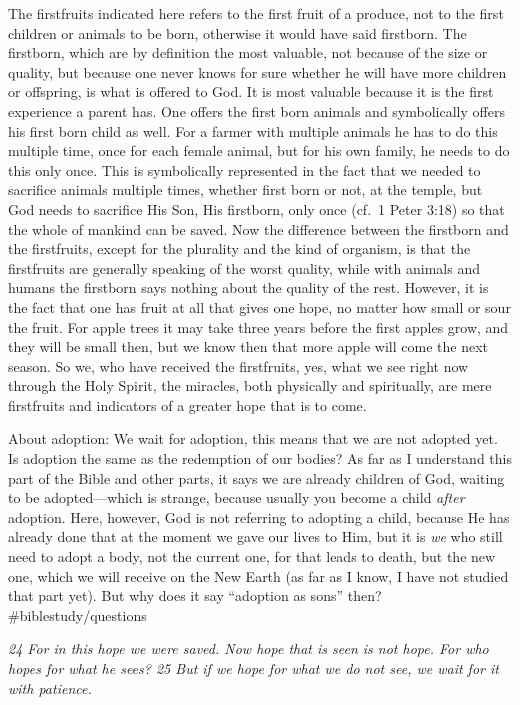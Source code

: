 The firstfruits indicated here refers to the first fruit of a produce,
not to the first children or animals to be born, otherwise it would have
said firstborn. The firstborn, which are by definition the most
valuable, not because of the size or quality, but because one never
knows for sure whether he will have more children or offspring, is what
is offered to God. It is most valuable because it is the first
experience a parent has. One offers the first born animals and
symbolically offers his first born child as well. For a farmer with
multiple animals he has to do this multiple time, once for each female
animal, but for his own family, he needs to do this only once. This is
symbolically represented in the fact that we needed to sacrifice animals
multiple times, whether first born or not, at the temple, but God needs
to sacrifice His Son, His firstborn, only once (cf.~1 Peter 3:18) so
that the whole of mankind can be saved. Now the difference between the
firstborn and the firstfruits, except for the plurality and the kind of
organism, is that the firstfruits are generally speaking of the worst
quality, while with animals and humans the firstborn says nothing about
the quality of the rest. However, it is the fact that one has fruit at
all that gives one hope, no matter how small or sour the fruit. For
apple trees it may take three years before the first apples grow, and
they will be small then, but we know then that more apple will come the
next season. So we, who have received the firstfruits, yes, what we see
right now through the Holy Spirit, the miracles, both physically and
spiritually, are mere firstfruits and indicators of a greater hope that
is to come.

About adoption: We wait for adoption, this means that we are not adopted
yet. Is adoption the same as the redemption of our bodies? As far as I
understand this part of the Bible and other parts, it says we are
already children of God, waiting to be adopted---which is strange,
because usually you become a child \emph{after} adoption. Here, however,
God is not referring to adopting a child, because He has already done
that at the moment we gave our lives to Him, but it is \emph{we} who
still need to adopt a body, not the current one, for that leads to
death, but the new one, which we will receive on the New Earth (as far
as I know, I have not studied that part yet). But why does it say
``adoption as sons'' then? \#biblestudy/questions

\emph{24 For in this hope we were saved. Now hope that is seen is not
hope. For who hopes for what he sees? 25 But if we hope for what we do
not see, we wait for it with patience.}

